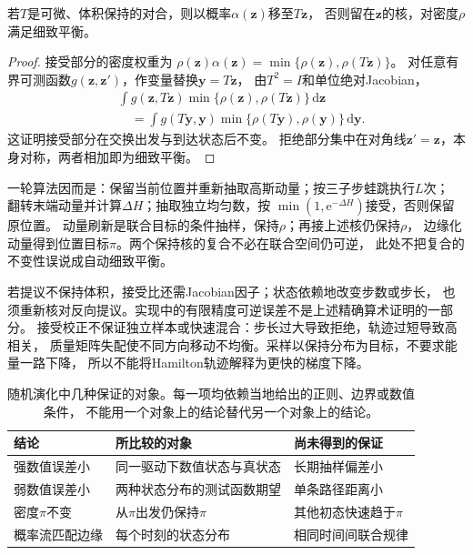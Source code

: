 \begin{theorem}[HMC提议的细致平衡]
 \label{thm:action-state-hmc-balance}
 若$T$是可微、体积保持的对合，则以概率$\alpha(\bm z)$移至$T\bm z$，
 否则留在$\bm z$的核，对密度$\rho$满足细致平衡。
\end{theorem}
\begin{proof}
 接受部分的密度权重为
 $\rho(\bm z)\alpha(\bm z)=\min\{\rho(\bm z),\rho(T\bm z)\}$。
 对任意有界可测函数$g(\bm z,\bm z')$，作变量替换$\bm y=T\bm z$，
 由$T^2=I$和单位绝对Jacobian，
 \[
 \begin{split}
 &\int g(\bm z,T\bm z)\min\{\rho(\bm z),\rho(T\bm z)\}\,\mathrm d\bm z\\
 &\quad=\int g(T\bm y,\bm y)
                   \min\{\rho(T\bm y),\rho(\bm y)\}\,\mathrm d\bm y .
 \end{split}
 \]
 这证明接受部分在交换出发与到达状态后不变。
 拒绝部分集中在对角线$\bm z'=\bm z$，本身对称，两者相加即为细致平衡。
\end{proof}

一轮算法因而是：保留当前位置并重新抽取高斯动量；按三子步蛙跳执行$L$次；
翻转末端动量并计算$\Delta H$；抽取独立均匀数，按
$\min(1,\mathrm e^{-\Delta H})$接受，否则保留原位置。
动量刷新是联合目标的条件抽样，保持$\rho$；再接上述核仍保持$\rho$，
边缘化动量得到位置目标$\pi$。两个保持核的复合不必在联合空间仍可逆，
此处不把复合的不变性误说成自动细致平衡。

若提议不保持体积，接受比还需Jacobian因子；状态依赖地改变步数或步长，
也须重新核对反向提议。实现中的有限精度可逆误差不是上述精确算术证明的一部分。
接受校正不保证独立样本或快速混合：步长过大导致拒绝，轨迹过短导致高相关，
质量矩阵失配使不同方向移动不均衡。采样以保持分布为目标，不要求能量一路下降，
所以不能将Hamilton轨迹解释为更快的梯度下降。

\begin{table}[htbp]
 \centering
 \begin{tabularx}{\linewidth}{lXX}
 \toprule
 结论 & 所比较的对象 & 尚未得到的保证\\
 \midrule
 强数值误差小 & 同一驱动下数值状态与真状态 & 长期抽样偏差小\\
 弱数值误差小 & 两种状态分布的测试函数期望 & 单条路径距离小\\
 密度$\pi$不变 & 从$\pi$出发仍保持$\pi$ & 其他初态快速趋于$\pi$\\
 概率流匹配边缘 & 每个时刻的状态分布 & 相同时间间联合规律\\
 \bottomrule
 \end{tabularx}
 \caption{随机演化中几种保证的对象。每一项均依赖当地给出的正则、边界或数值条件，
 不能用一个对象上的结论替代另一个对象上的结论。}
 \label{tab:dynamical-path-distribution}
\end{table}

